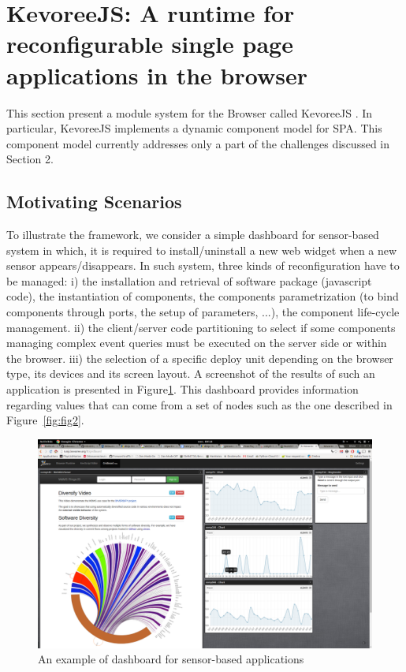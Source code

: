 \section{KevoreeJS: A runtime for reconfigurable single page applications in the browser}

This section present a module system for the Browser called KevoreeJS .
In particular, KevoreeJS implements a dynamic component model for SPA.
This component model currently addresses only a part of the challenges discussed in Section 2.

\subsection{Motivating Scenarios }
To illustrate the framework, we consider a simple dashboard for sensor-based system in which, it is required to install/uninstall a new web widget when a new sensor appears/disappears. In such system, three kinds of reconfiguration have to be managed: i) the installation and retrieval of software package (javascript code), the instantiation of components, the components parametrization (to bind components through ports, the setup of parameters, ...), the component life-cycle management. ii)  the client/server code partitioning to select if some components managing complex event queries must be executed on the server side or within the browser. iii) the selection of a specific deploy unit depending on the browser type, its devices and its screen layout. A screenshot of the results of such an application is presented in Figure\ref{fig:fig1}. This dashboard provides information regarding values that can come from a set of nodes such as the one described in Figure~\ref{fig:fig2}.


\begin{figure}[h]
	\center
	\includegraphics[width=1\textwidth]{figures/fig3}
	\caption{An example of dashboard for sensor-based applications}
	\label{fig:fig1}
\end{figure}


